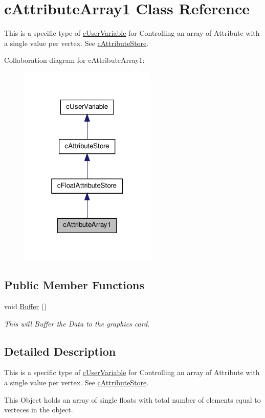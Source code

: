 \hypertarget{classc_attribute_array1}{
\section{cAttributeArray1 Class Reference}
\label{classc_attribute_array1}
}


This is a specific type of \hyperlink{classc_user_variable}{cUserVariable} for Controlling an array of Attribute with a single value per vertex. See \hyperlink{classc_attribute_store}{cAttributeStore}.  




Collaboration diagram for cAttributeArray1:\nopagebreak
\begin{figure}[H]
\begin{center}
\leavevmode
\includegraphics[width=184pt]{classc_attribute_array1__coll__graph}
\end{center}
\end{figure}
\subsection*{Public Member Functions}
\begin{DoxyCompactItemize}
\item 
\hypertarget{classc_attribute_array1_a8020ff4b776221c74f00efc1087344ba}{
void \hyperlink{classc_attribute_array1_a8020ff4b776221c74f00efc1087344ba}{Buffer} ()}
\label{classc_attribute_array1_a8020ff4b776221c74f00efc1087344ba}

\begin{DoxyCompactList}\small\item\em This will Buffer the Data to the graphics card. \end{DoxyCompactList}\end{DoxyCompactItemize}


\subsection{Detailed Description}
This is a specific type of \hyperlink{classc_user_variable}{cUserVariable} for Controlling an array of Attribute with a single value per vertex. See \hyperlink{classc_attribute_store}{cAttributeStore}. 

This Object holds an array of single floats with total number of elements equal to verteces in the object. 